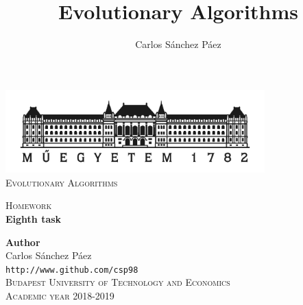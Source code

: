 \documentclass[12pt,english]{article}
\title{Evolutionary Algorithms}
\author{Carlos Sánchez Páez}
\begin{document}
\begin{titlepage}

\newlength{\centeroffset}
\setlength{\centeroffset}{-0.5\oddsidemargin}
\addtolength{\centeroffset}{0.5\evensidemargin}
\thispagestyle{empty}

\noindent\hspace*{\centeroffset}
\begin{minipage}{\textwidth}

\centering
\includegraphics[width=0.75\textwidth]{bme_logo.jpg}\\[1.4cm]

\textsc{ \Large Evolutionary Algorithms\\[4cm]}

\textsc{\Huge Homework}\\[0.75cm]

{\Large\bfseries Eighth task\\}
\end{minipage}

\vspace{8cm}
\noindent\hspace*{\centeroffset}
\begin{minipage}{\textwidth}
\centering

\textbf{Author}\\ {Carlos Sánchez Páez}\\
\texttt{http://www.github.com/csp98}\\[0.5cm]
\textsc{Budapest University of Technology and Economics}\\
\vspace{1cm}
\textsc{Academic year 2018-2019}
\end{minipage}
\end{titlepage}
\thispagestyle{empty}

\newpage
\end{document}
